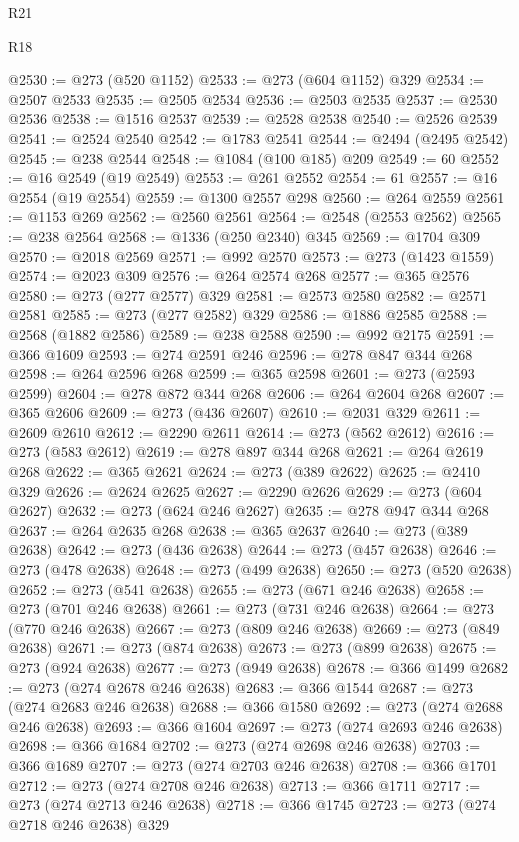 \begin{lexlean}{R21}
\begin{lexlean}{R18}
\begin{coremodule}
{{{{{{{{{{{{{{{{{{{{{{{{{{{{{{{{{{{{{{{{{{{{{{{{{{{{{{{{{{{{{{{{{{{{{{{{{{{{{{{{{{{{{{{{{{{{{{{{{{{{{{{{{{{{{{{{{{{{{{{{{{{{{{{{{{{{{{{{{{{{{{{@2530 := @273 (@520 @1152)
@2533 := @273 (@604 @1152) @329
@2534 := @2507 @2533
@2535 := @2505 @2534
@2536 := @2503 @2535
@2537 := @2530 @2536
@2538 := @1516 @2537
@2539 := @2528 @2538
@2540 := @2526 @2539
@2541 := @2524 @2540
@2542 := @1783 @2541
@2544 := @2494 (@2495 @2542)
@2545 := @238 @2544
@2548 := @1084 (@100 @185) @209
@2549 := 60
@2552 := @16 @2549 (@19 @2549)
@2553 := @261 @2552
@2554 := 61
@2557 := @16 @2554 (@19 @2554)
@2559 := @1300 @2557 @298
@2560 := @264 @2559
@2561 := @1153 @269
@2562 := @2560 @2561
@2564 := @2548 (@2553 @2562)
@2565 := @238 @2564
@2568 := @1336 (@250 @2340) @345
@2569 := @1704 @309
@2570 := @2018 @2569
@2571 := @992 @2570
@2573 := @273 (@1423 @1559)
@2574 := @2023 @309
@2576 := @264 @2574 @268
@2577 := @365 @2576
@2580 := @273 (@277 @2577) @329
@2581 := @2573 @2580
@2582 := @2571 @2581
@2585 := @273 (@277 @2582) @329
@2586 := @1886 @2585
@2588 := @2568 (@1882 @2586)
@2589 := @238 @2588
@2590 := @992 @2175
@2591 := @366 @1609
@2593 := @274 @2591 @246
@2596 := @278 @847 @344 @268
@2598 := @264 @2596 @268
@2599 := @365 @2598
@2601 := @273 (@2593 @2599)
@2604 := @278 @872 @344 @268
@2606 := @264 @2604 @268
@2607 := @365 @2606
@2609 := @273 (@436 @2607)
@2610 := @2031 @329
@2611 := @2609 @2610
@2612 := @2290 @2611
@2614 := @273 (@562 @2612)
@2616 := @273 (@583 @2612)
@2619 := @278 @897 @344 @268
@2621 := @264 @2619 @268
@2622 := @365 @2621
@2624 := @273 (@389 @2622)
@2625 := @2410 @329
@2626 := @2624 @2625
@2627 := @2290 @2626
@2629 := @273 (@604 @2627)
@2632 := @273 (@624 @246 @2627)
@2635 := @278 @947 @344 @268
@2637 := @264 @2635 @268
@2638 := @365 @2637
@2640 := @273 (@389 @2638)
@2642 := @273 (@436 @2638)
@2644 := @273 (@457 @2638)
@2646 := @273 (@478 @2638)
@2648 := @273 (@499 @2638)
@2650 := @273 (@520 @2638)
@2652 := @273 (@541 @2638)
@2655 := @273 (@671 @246 @2638)
@2658 := @273 (@701 @246 @2638)
@2661 := @273 (@731 @246 @2638)
@2664 := @273 (@770 @246 @2638)
@2667 := @273 (@809 @246 @2638)
@2669 := @273 (@849 @2638)
@2671 := @273 (@874 @2638)
@2673 := @273 (@899 @2638)
@2675 := @273 (@924 @2638)
@2677 := @273 (@949 @2638)
@2678 := @366 @1499
@2682 := @273 (@274 @2678 @246 @2638)
@2683 := @366 @1544
@2687 := @273 (@274 @2683 @246 @2638)
@2688 := @366 @1580
@2692 := @273 (@274 @2688 @246 @2638)
@2693 := @366 @1604
@2697 := @273 (@274 @2693 @246 @2638)
@2698 := @366 @1684
@2702 := @273 (@274 @2698 @246 @2638)
@2703 := @366 @1689
@2707 := @273 (@274 @2703 @246 @2638)
@2708 := @366 @1701
@2712 := @273 (@274 @2708 @246 @2638)
@2713 := @366 @1711
@2717 := @273 (@274 @2713 @246 @2638)
@2718 := @366 @1745
@2723 := @273 (@274 @2718 @246 @2638) @329
}}}}}}}}}}}}}}}}}}}}}}}}}}}}}}}}}}}}}}}}}}}}}}}}}}}}}}}}}}}}}}}}}}}}}}}}}}}}}}}}}}}}}}}}}}}}}}}}}}}}}}}}}}}}}}}}}}}}}}}}}}}}}}}}}}}}}}}}}}}}}}}
\end{coremodule}
\end{lexlean}
\end{lexlean}
